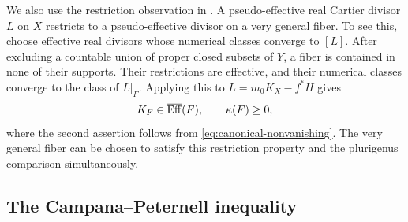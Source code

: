 We also use the restriction observation in
\cite[Section~7]{Schnell2022}. A pseudo-effective real Cartier
divisor $L$ on $X$ restricts to a pseudo-effective divisor on a very
general fiber. To see this, choose effective real divisors whose
numerical classes converge to $[L]$. After excluding a countable
union of proper closed subsets of $Y$, a fiber is contained in none
of their supports. Their restrictions are effective, and their
numerical classes converge to the class of $L|_F$. Applying this to
$L=m_0K_X-f^*H$ gives
\[
 K_F\in\overline{\operatorname{Eff}}(F),\qquad \kappa(F)\geq0,
\]
where the second assertion follows from
\eqref{eq:canonical-nonvanishing}. The very general fiber can be
chosen to satisfy this restriction property and the plurigenus
comparison simultaneously.

\subsection{The Campana--Peternell inequality}

